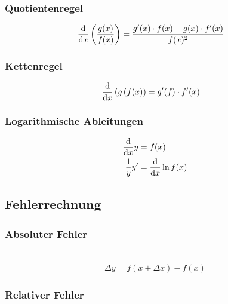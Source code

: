 \subsubsection*{Quotientenregel}
 \begin{align*} 
\frac{\mathop{}\!\mathrm{d} }{\mathop{}\!\mathrm{d} x}\left(\frac{g(x)}{f(x)}\right)&=\frac{g'(x)\cdot f(x)-g(x)\cdot f'(x)}{f(x)^2}
 \end{align*}

\begin{multicols}{2}
\subsubsection*{Kettenregel}
 \begin{align*} 
\frac{\mathop{}\!\mathrm{d} }{\mathop{}\!\mathrm{d} x}\left(g\left( f(x\right)\right)&=g'(f)\cdot f'(x)
 \end{align*}
\vfill            
\subsubsection*{Logarithmische Ableitungen}
 \begin{align*} 
\frac{\mathop{}\!\mathrm{d} }{\mathop{}\!\mathrm{d} x}y&=f(x)\\
\frac{1}{y}y'&=\frac{\mathop{}\!\mathrm{d} }{\mathop{}\!\mathrm{d} x}\ln{f(x)}
 \end{align*}
\vfill
\end{multicols}
          
\subsection{Fehlerrechnung}

\subsubsection*{Absoluter Fehler}
\\
\begin{align*} 
\Delta y=f(x+\Delta x)-f(x)
\end{align*}
         
\subsubsection*{Relativer Fehler}
\\

